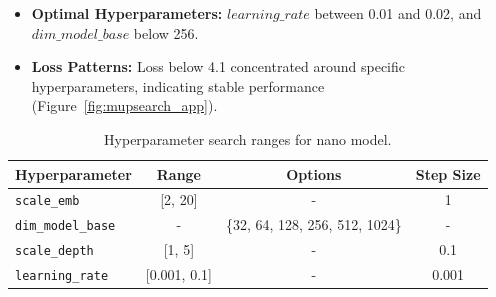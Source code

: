 \documentclass{article}
\begin{document}
\begin{itemize}
    \item \textbf{Optimal Hyperparameters:} $learning\_rate$ between 0.01 and 0.02, and $dim\_model\_base$ below 256. 
    \item \textbf{Loss Patterns:} Loss below 4.1 concentrated around specific hyperparameters, indicating stable performance (Figure~\ref{fig:mupsearch_app}).
\end{itemize}



\begin{table}[ht]
  \centering
  \setlength{\tabcolsep}{12pt} %
  \renewcommand{\arraystretch}{0.6} %
  \begin{tabular}{@{}lccc@{}}
    \toprule
    \textbf{Hyperparameter} & \textbf{Range} & \textbf{Options} & \textbf{Step Size} \\
    \midrule
    \texttt{scale\_emb} & [2, 20] & - & 1 \\
    \texttt{dim\_model\_base} & - & \{32, 64, 128, 256, 512, 1024\} & - \\
    \texttt{scale\_depth} & [1, 5] & - & 0.1 \\
    \texttt{learning\_rate} & [0.001, 0.1] & - & 0.001 \\
    \bottomrule
  \end{tabular}
  \caption{Hyperparameter search ranges for nano model.}
  \label{tab:hyperparameter_ranges}
\end{table}
\end{document}
